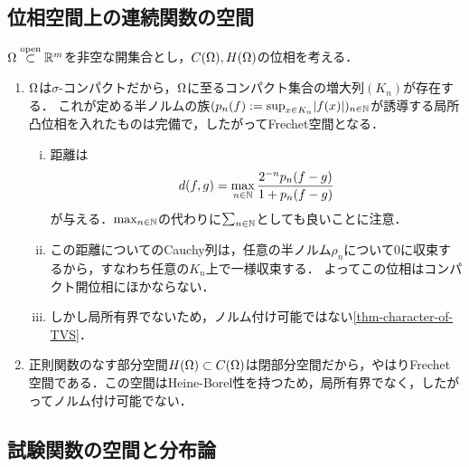 \documentclass[uplatex,dvipdfmx]{jsreport}
\begin{document}
\subsection{位相空間上の連続関数の空間}

\begin{example}[コンパクト開位相は距離化可能だがノルム付け可能でない]
    $\Omega\overset{\mathrm{open}}{\subset}\mathbb{R}^m$を非空な開集合とし，$C(\Omega), H(\Omega)$の位相を考える．
    \begin{enumerate}
        \item $\Omega$は$\sigma$-コンパクトだから，$\Omega$に至るコンパクト集合の増大列$(K_n)$が存在する．
        これが定める半ノルムの族$(p_n(f):=\sup_{x\in K_n}\lvert f(x)\rvert)_{n\in\mathbb{N}}$が誘導する局所凸位相を入れたものは完備で，したがってFrechet空間となる．
        \begin{enumerate}[(i)]
            \item 距離は
            \[d(f,g)=\max_{n\in\mathbb{N}}\frac{2^{-n}p_n(f-g)}{1+p_n(f-g)}\]
            が与える．$\max_{n\in\mathbb{N}}$の代わりに$\sum_{n\in\mathbb{N}}$としても良いことに注意．
            \item この距離についてのCauchy列は，任意の半ノルム$\rho_n$について$0$に収束するから，すなわち任意の$K_n$上で一様収束する．
            よってこの位相はコンパクト開位相にほかならない．
            \item しかし局所有界でないため，ノルム付け可能ではない\ref{thm-character-of-TVS}．
        \end{enumerate}
        \item 正則関数のなす部分空間$H(\Omega)\subset C(\Omega)$は閉部分空間だから，やはりFrechet空間である．この空間はHeine-Borel性を持つため，局所有界でなく，したがってノルム付け可能でない．
    \end{enumerate}
\end{example}

\subsection{試験関数の空間と分布論}
\end{document}
